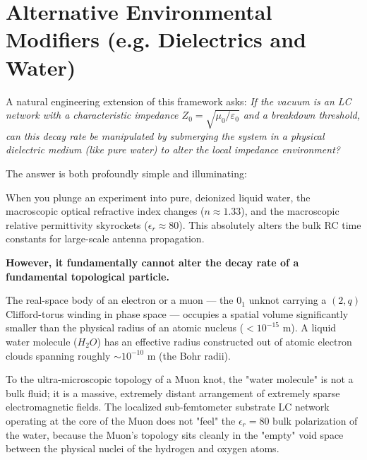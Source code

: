 \section{Alternative Environmental Modifiers (e.g. Dielectrics and Water)}
A natural engineering extension of this framework asks: \textit{If the vacuum is an LC network with a characteristic impedance $Z_0 = \sqrt{\mu_0/\varepsilon_0}$ and a breakdown threshold, can this decay rate be manipulated by submerging the system in a physical dielectric medium (like pure water) to alter the local impedance environment?}

The answer is both profoundly simple and illuminating:

When you plunge an experiment into pure, deionized liquid water, the macroscopic optical refractive index changes ($n \approx 1.33$), and the macroscopic relative permittivity skyrockets ($\epsilon_r \approx 80$). This absolutely alters the bulk RC time constants for large-scale antenna propagation.

\textbf{However, it fundamentally cannot alter the decay rate of a fundamental topological particle.} 

The real-space body of an electron or a muon --- the $0_1$ unknot carrying a $(2,q)$ Clifford-torus winding in phase space --- occupies a spatial volume significantly smaller than the physical radius of an atomic nucleus ($< 10^{-15} \text{ m}$). A liquid water molecule ($H_2O$) has an effective radius constructed out of atomic electron clouds spanning roughly $\sim 10^{-10} \text{ m}$ (the Bohr radii). 

To the ultra-microscopic topology of a Muon knot, the "water molecule" is not a bulk fluid; it is a massive, extremely distant arrangement of extremely sparse electromagnetic fields. The localized sub-femtometer substrate LC network operating at the core of the Muon does not "feel" the $\epsilon_r = 80$ bulk polarization of the water, because the Muon's topology sits cleanly in the "empty" void space between the physical nuclei of the hydrogen and oxygen atoms.

